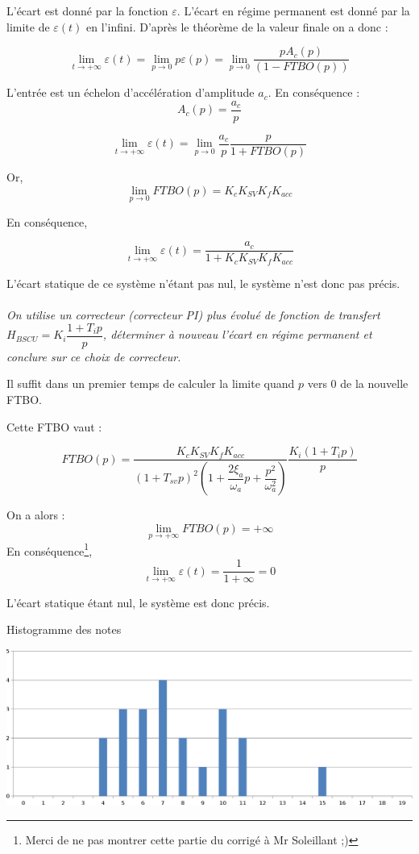 \documentclass[10pt,oneside]{article}
\begin{document}
L'écart est donné par la fonction $\varepsilon$. L'écart en régime permanent
est donné par la limite de $\varepsilon(t)$ en l'infini. D'après le théorème de
la valeur finale on a donc :

$$
\lim\limits_{t\to +\infty} \varepsilon(t) = \lim\limits_{p\to 0}
p\varepsilon(p) =  \lim\limits_{p\to 0} \dfrac{p A_c(p)}{\left(
1-FTBO(p)\right)}
$$


L'entrée est un échelon d'accélération d'amplitude $a_c$. En conséquence : 
$$A_c (p)=\dfrac{a_c}{p}$$

$$
\lim\limits_{t\to +\infty} \varepsilon(t) = \lim\limits_{p\to 0}
\dfrac{a_c}{p} \dfrac{p}{1+FTBO(p)}
$$

Or, 
$$
 \lim\limits_{p\to 0} FTBO(p) = K_cK_{SV}K_fK_{acc}
$$

En conséquence, 

$$
\lim\limits_{t\to +\infty} \varepsilon(t) = \dfrac{a_c}{1+K_cK_{SV}K_fK_{acc}}
$$

L'écart statique de ce système n'étant pas nul, le système n'est donc pas
précis.

\paragraph{}
\textit{On utilise un correcteur (correcteur PI) plus évolué de fonction de transfert
$H_{BSCU}=K_i\dfrac{1+T_i p}{p}$, déterminer à nouveau l'écart en régime permanent et conclure sur ce choix de
correcteur.}

Il suffit dans un premier temps de calculer la limite quand $p$ vers 0 
de la nouvelle FTBO. 

Cette FTBO vaut :

$$
FTBO(p)=
\dfrac{K_cK_{SV}K_fK_{acc}}{\left( 1+T_{sv}p
\right)^2\left(1+\dfrac{2\xi_a}{\omega_a}p+\dfrac{p^2}{\omega_a^2}\right)}
\dfrac{K_i\left(1+T_i p\right)}{p}
$$

On a alors :
$$
\lim\limits_{p\to+\infty}FTBO(p)=+\infty
$$
En conséquence\footnote{Merci de ne pas montrer cette partie du corrigé à Mr
Soleillant ;)}, 
$$
\lim\limits_{t\to +\infty} \varepsilon(t) = \dfrac{1}{1+\infty} = 0
$$

L'écart statique étant nul, le système est donc précis.

\begin{center}
 Histogramme des notes

\includegraphics[width=.9\textwidth]{png/notes}
\end{center}
\end{document}
